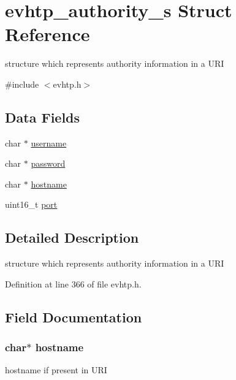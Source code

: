 \hypertarget{structevhtp__authority__s}{\section{evhtp\-\_\-authority\-\_\-s \-Struct \-Reference}
\label{structevhtp__authority__s}
}


structure which represents authority information in a \-U\-R\-I  




{\ttfamily \#include $<$evhtp.\-h$>$}

\subsection*{\-Data \-Fields}
\begin{DoxyCompactItemize}
\item 
char $\ast$ \hyperlink{structevhtp__authority__s_a9b20c006bd90a09e1465fb668700e81d}{username}
\item 
char $\ast$ \hyperlink{structevhtp__authority__s_a59460a3ff2c12443d1022e5cc0fba85c}{password}
\item 
char $\ast$ \hyperlink{structevhtp__authority__s_af203df082d5c6dcaa0c88b07cf86466d}{hostname}
\item 
uint16\-\_\-t \hyperlink{structevhtp__authority__s_a8e0798404bf2cf5dabb84c5ba9a4f236}{port}
\end{DoxyCompactItemize}


\subsection{\-Detailed \-Description}
structure which represents authority information in a \-U\-R\-I 

\-Definition at line 366 of file evhtp.\-h.



\subsection{\-Field \-Documentation}
\hypertarget{structevhtp__authority__s_af203df082d5c6dcaa0c88b07cf86466d}{
\subsubsection[{hostname}]{\setlength{\rightskip}{0pt plus 5cm}char$\ast$ {\bf hostname}}}\label{structevhtp__authority__s_af203df082d5c6dcaa0c88b07cf86466d}
hostname if present in \-U\-R\-I 

